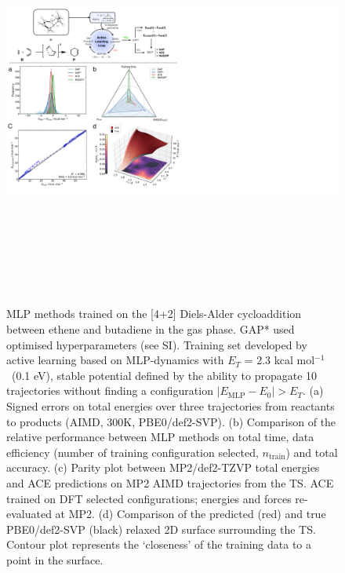 \documentclass[twoside,twocolumn,9pt]{article}
\newcommand{\kcal}{kcal mol$^{-1}$}
\begin{document}
\begin{figure}[tb]
	\centering
	\includegraphics[height=13.7cm]{figX1}
	\caption{MLP methods trained on the [4+2] Diels-Alder cycloaddition between ethene and butadiene in the gas phase. GAP* used optimised hyperparameters (see SI). Training set developed by active learning based on MLP-dynamics with $E_T$ = 2.3 \kcal~(0.1 eV), stable potential defined by the ability to propagate 10 trajectories without finding a configuration $|E_\text{MLP} - E_0| > E_T$. (a) Signed errors on total energies over three trajectories from reactants to products (AIMD, 300K, PBE0/def2-SVP). (b) Comparison of the relative performance between MLP methods on total time, data efficiency (number of training configuration selected, $n_\text{train}$) and total accuracy. (c) Parity plot between MP2/def2-TZVP total energies and ACE predictions on MP2 AIMD trajectories from the TS. ACE trained on DFT selected configurations; energies and forces re-evaluated at MP2. (d) Comparison of the predicted (red) and true PBE0/def2-SVP (black) relaxed 2D surface surrounding the TS. Contour plot represents the ‘closeness’ of the training data to a point in the surface.}
	\label{fig::X1}
\end{figure}
\end{document}
